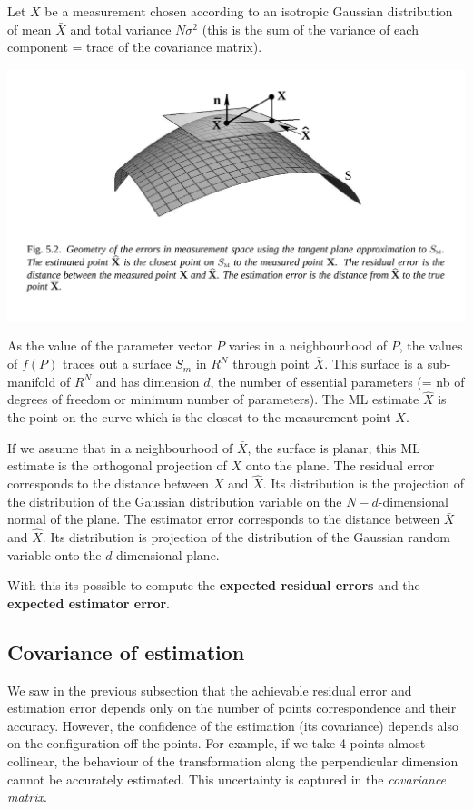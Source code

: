 Let $X$ be a measurement chosen according to an isotropic Gaussian distribution of mean $\bar{X}$ and total variance $N\sigma^2$ (this is the sum of the variance of each component = trace of the covariance matrix).

\includegraphics[scale=0.25]{content/MLE.png}

As the value of the parameter vector $P$ varies in a neighbourhood of $\bar{P}$, the values of $f(P)$ traces out a surface $S_m$ in $R^N$ through point $\bar{X}$. This surface is a sub-manifold of $R^N$ and has dimension $d$, the number of essential parameters (= nb of degrees of freedom or minimum number of parameters). The ML estimate $\hat{X}$ is the point on the curve which is the closest to the measurement point $X$.

If we assume that in a neighbourhood of $\bar{X}$, the surface is planar, this ML estimate is the orthogonal projection of $X$ onto the plane.
The residual error corresponds to the distance between $X$ and $\hat{X}$. Its distribution is the projection of the distribution of the Gaussian distribution variable on the $N-d$-dimensional normal of the plane.
The estimator error corresponds to the distance between $\bar{X}$ and $\hat{X}$. Its distribution is projection of the distribution of the Gaussian random variable onto the $d$-dimensional plane.

With this its possible to compute the \textbf{expected residual errors} and the \textbf{expected estimator error}.

\subsection{Covariance of estimation}

We saw in the previous subsection that the achievable residual error and estimation error depends only on the number of points correspondence and their accuracy. However, the confidence of the estimation (its covariance) depends also on the configuration off the points. For example, if we take 4 points almost collinear, the behaviour of the transformation along the perpendicular dimension cannot be accurately estimated. This uncertainty is captured in the \textit{covariance matrix}.

